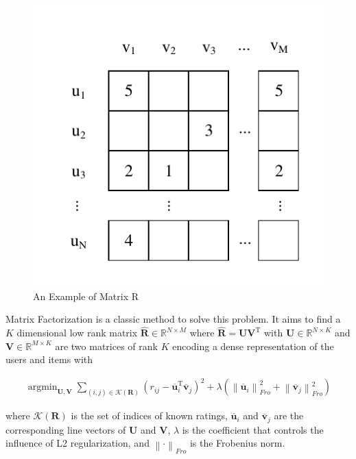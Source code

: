 \documentclass{sig-alternate-05-2015}
\DeclareMathOperator*{\argmin}{argmin}
\begin{document}
\begin{figure}[htbp]
	\centering
	\includegraphics[scale=0.8]{images/3.pdf}
	\caption{An Example of Matrix R}
	\label{fig:matrix}
\end{figure}

Matrix Factorization is a classic method to solve this problem.
It aims to find a $K$ dimensional low rank matrix $\mathbf{\hat{R}} \in \mathbb{R}^{N \times M}$
where $\mathbf{\hat{R}} = \mathbf{U} \mathbf{V}^\mathrm{T}$ with
$\mathbf{U} \in \mathbb{R}^{N \times K}$ and $\mathbf{V} \in \mathbb{R}^{M \times K}$
are two matrices of rank $K$ encoding a dense representation of the users and items with

\begin{equation}
\begin{aligned}
	\argmin_{\mathbf{U},\mathbf{V}}
	\sum_{(i,j) \in \mathcal{K}(\mathbf{R})}
	( r_{ij} - \overline{\mathbf{u}}_i^{\mathrm{T}} \overline{\mathbf{v}}_j ) ^ 2 +
	\lambda ( \left\| \overline{\mathbf{u}}_i \right\|_{Fro}^2 +
	\left\| \overline{\mathbf{v}}_j \right\|_{Fro}^2 )
\end{aligned}
\end{equation}

where $\mathcal{K}(\mathbf{R})$ is the set of indices of known ratings,
$\overline{\mathbf{u}}_i$ and $\overline{\mathbf{v}}_j$
are the corresponding line vectors of $\mathbf{U}$ and $\mathbf{V}$,
$\lambda$ is the coefficient that controls the influence of L2 regularization,
and $\left\| \cdot \right\|_{Fro}$ is the Frobenius norm.
\end{document}

